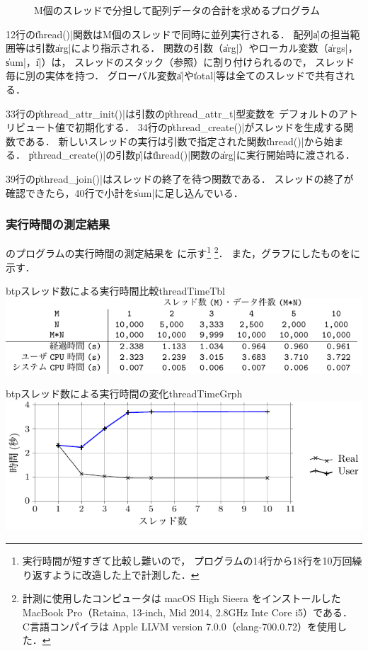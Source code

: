 \begin{figure}[btp]

\caption{M個のスレッドで分担して配列データの合計を求めるプログラム}
\label{fig:threadTest}
\end{figure}

12行の\|thread()|関数はM個のスレッドで同時に並列実行される．
配列\|a|の担当範囲等は引数\|arg|により指示される．
関数の引数（\|arg|）やローカル変数（\|args|，\|sum|，\|i|）は，
スレッドのスタック（参照）に割り付けられるので，
スレッド毎に別の実体を持つ．
グローバル変数\|a|や\|total|等は全てのスレッドで共有される．

33行の\|pthread_attr_init()|は引数の\|pthread_attr_t|型変数を
デフォルトのアトリビュート値で初期化する．
34行の\|pthread_create()|がスレッドを生成する関数である．
新しいスレッドの実行は引数で指定された関数\|thread()|から始まる．
\|pthread_create()|の引数\|p|は\|thread()|関数の\|arg|に実行開始時に渡される．

39行の\|pthread_join()|はスレッドの終了を待つ関数である．
スレッドの終了が確認できたら，40行で小計を\|sum|に足し込んでいる．

\subsubsection{実行時間の測定結果}
のプログラムの実行時間の測定結果を
に示す\footnote{
実行時間が短すぎて比較し難いので，
プログラムの14行から18行を10万回繰り返すように改造した上で計測した．}
\footnote{
計測に使用したコンピュータは
macOS High Sieera をインストールした
MacBook Pro（Retaina, 13-inch, Mid 2014, 2.8GHz Inte Core i5）である．
C言語コンパイラは
Apple LLVM version 7.0.0（clang-700.0.72）を使用した．
}．
また，グラフにしたものをに示す．

\begin{mytable}{btp}{スレッド数による実行時間比較}{threadTimeTbl}
\includegraphics[scale=1.0]{Tbl/threadTimeTbl.pdf}
\end{mytable}

\begin{myfig}{btp}{スレッド数による実行時間の変化}{threadTimeGrph}
\includegraphics[scale=0.9]{Tbl/threadTimeGrph.pdf}
\end{myfig}

